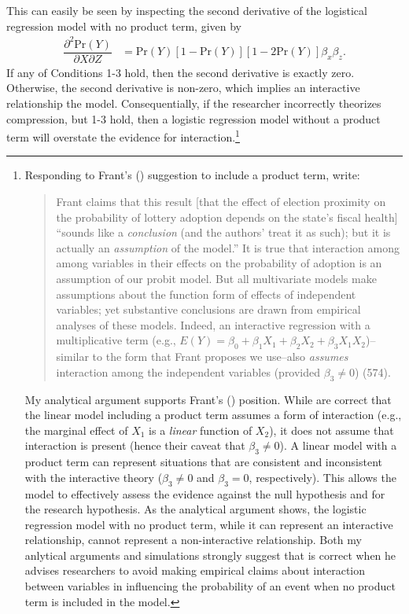 \documentclass[12pt]{article}
\begin{document}
This can easily be seen by inspecting the second derivative of the logistical regression model with no product term, given by 
\begin{align}
\dfrac{\partial^2 \text{Pr}(Y)}{\partial X \partial Z} &=  \text{Pr}(Y)[1 - \text{Pr}(Y)][1 - 2\text{Pr}(Y)]\beta_x \beta_z. \label{eqn:dnoprod}
\end{align}
If any of Conditions 1-3 hold, then the second derivative is exactly zero. Otherwise, the second derivative is non-zero, which implies an interactive relationship the model. Consequentially, if the researcher incorrectly theorizes compression, but 1-3 hold, then a logistic regression model without a product term will overstate the evidence for interaction.\footnote{Responding to Frant's (\citeyear{Frant1991}) suggestion to include a product term, \cite{BerryBerry1991} write: 
\begin{quote}
Frant claims that this result [that the effect of election proximity on the probability of lottery adoption depends on the state's fiscal health] ``sounds like a \textit{conclusion} (and the authors' treat it as such); but it is actually an \textit{assumption} of the model.'' It is true that interaction among among variables in their effects on the probability of adoption is an assumption of our probit model. But all multivariate models make assumptions about the function form of effects of independent variables; yet substantive conclusions are drawn from empirical analyses of these models. Indeed, an interactive regression with a multiplicative term (e.g., $E(Y) = \beta_0 + \beta_1X_1 +\beta_2X_2 + \beta_3X_1X_2$)--similar to the form that Frant proposes we use--also \textit{assumes} interaction among the independent variables (provided $\beta_3 \neq 0$) (574). 
\end{quote}
My analytical argument supports Frant's (\citeyear{Frant1991}) position. While \cite{BerryBerry1991} are correct that the linear model including a product term assumes a form of interaction (e.g., the marginal effect of $X_1$ is a \textit{linear} function of $X_2$), it does not assume that interaction is present (hence their caveat that $\beta_3 \neq 0$). A linear model with a product term can represent situations that are consistent and inconsistent with the interactive theory ($\beta_3 \neq 0$ and $\beta_3 = 0$, respectively). This allows the model to effectively assess the evidence against the null hypothesis and for the research hypothesis. As the analytical argument shows, the logistic regression model with no product term, while it can represent an interactive relationship, cannot represent a non-interactive relationship. Both my anlytical arguments and simulations strongly suggest that \cite{Frant1991} is correct when he advises researchers to avoid making empirical claims about interaction between variables in influencing the probability of an event when no product term is included in the model.} 
\end{document}
